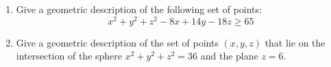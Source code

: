 \documentclass[%
]{article}
\newcommand{\vect}[1]{\mathbf{#1}}
\begin{document}
\begin{enumerate}


\item %
Give a geometric description of the following set of points:
\[
x^2+y^2+z^2-8x+14y-18z\geq 65
\]



\item %
Give a geometric description of the set of points $(x,y,z)$ that lie on the intersection of the sphere $x^2+y^2+z^2=36$ and the plane $z=6$.





\end{enumerate}
\end{document}
